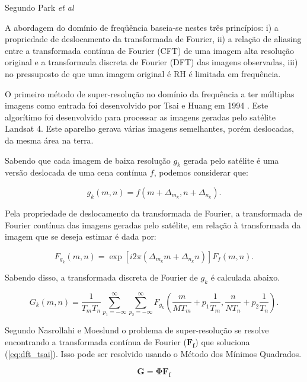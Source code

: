 Segundo Park \emph{et al} 
\begin{citacao}
	A abordagem do domínio de freqüência baseia-se nestes três princípios: i)
	a propriedade de deslocamento da transformada de Fourier, ii) a relação
	de aliasing entre a transformada contínua de Fourier (CFT) de uma
	imagem alta resolução original e a transformada discreta de Fourier
	(DFT) das imagens observadas, iii) no pressuposto de que uma imagem
	original é RH é limitada em frequência. \cite{park2003super}
\end{citacao}

O primeiro método de super-resolução no domínio da frequência a ter múltiplas imagens como entrada foi desenvolvido por Tsai e Huang em 1994 \cite{nasrollahi2014super}.
Este algorítimo foi desenvolvido para processar as imagens geradas pelo satélite Landsat 4.
Este aparelho gerava várias imagens semelhantes, porém deslocadas, da mesma área na
terra.

Sabendo que cada imagem de baixa resolução $g_k$ gerada pelo satélite é uma versão deslocada de uma cena contínua $f$, podemos considerar que:

\begin{equation}
	g_k(m,n) = f(m + \Delta_{m_k}, n + \Delta_{n_k}).
\end{equation}

Pela propriedade de deslocamento da transformada de Fourier, a transformada de Fourier contínua das imagens geradas pelo satélite, em relação à transformada da imagem que se deseja estimar é dada por:

\begin{equation}
	F_{g_k} (m,n) = \exp{[i2\pi (\Delta_{m_k}m + \Delta_{n_k}n)]} F_f (m,n).
\end{equation}

Sabendo disso, a transformada discreta de Fourier de $g_k$ é calculada abaixo.

\begin{equation}
	G_k(m,n) = \frac{1}{T_m T_n} \sum^\infty_{p_1=-\infty} \sum^\infty_{p_2=-\infty}
	F_{g_k} \left( \frac{m}{MT_m} + p_1 \frac{1}{T_m},
	\frac{n}{NT_n} + p_2\frac{1}{T_n} \right).
\end{equation}

Segundo Nasrollahi e Moeslund \cite{nasrollahi2014super} o problema de super-resolução se resolve encontrando a transformada contínua de Fourier ($\mathbf{F_f}$) que soluciona (\ref{eq:dft_tsai}).
Isso pode ser resolvido usando o Método dos Mínimos Quadrados.

\begin{equation}
	\label{eq:dft_tsai}
	\mathbf{G} = \mathbf{\Phi F_f}
\end{equation}

